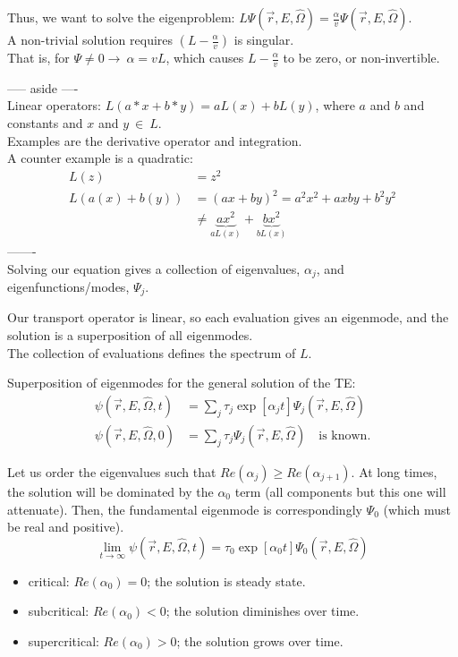 \documentclass[12pt]{article}
\newcommand{\rvec}{\ensuremath{\vec{r}}}
\newcommand{\vOmega}{\ensuremath{\hat{\Omega}}}
\begin{document}
Thus, we want to solve the eigenproblem: $L\Psi(\rvec, E, \vOmega) = \frac{\alpha}{v}\Psi(\rvec, E, \vOmega)$.\\
A non-trivial solution requires $(L - \frac{\alpha}{v})$ is singular. \\
That is, for $\Psi \neq 0 \rightarrow \: \alpha = v L$, which causes $L - \frac{\alpha}{v}$ to be zero, or non-invertible.


----- aside ----\\
Linear operators: $L(a*x + b*y) = aL(x) + bL(y)$, where $a$ and $b$ and constants and $x$ and $y \: \in \: L$.\\
Examples are the derivative operator and integration. \\
A counter example is a quadratic:
\begin{align*}
L(z) &= z^2 \\
L(a(x) + b(y)) &= (ax + by)^2 = a^2 x^2 + axby + b^2 y^2 \\
& \neq \underbrace{a x^2}_{aL(x)} + \underbrace{b x^2}_{bL(x)}
\end{align*}
-------\\
Solving our equation gives a collection of eigenvalues, $\alpha_j$, and eigenfunctions/modes, $\Psi_j$. 

Our transport operator is linear, so each evaluation gives an eigenmode, and the solution is a superposition of all eigenmodes. \\
The collection of evaluations defines the spectrum of $L$.

Superposition of eigenmodes for the general solution of the TE:
\begin{align*}
\psi(\rvec, E, \vOmega, t) &= \sum_{j} \tau_j \exp[\alpha_j t] \Psi_j(\rvec, E, \vOmega) \\
\psi(\rvec, E, \vOmega, 0) &= \sum_{j} \tau_j \Psi_j(\rvec, E, \vOmega) \quad \text{is known.}
\end{align*}

Let us order the eigenvalues such that $Re(\alpha_j) \geq Re(\alpha_{j+1})$. At long times, the solution will be dominated by the $\alpha_0$ term (all components but this one will attenuate). Then, the fundamental eigenmode is correspondingly $\Psi_0$ (which must be real and positive).
\[\lim_{t \to \infty} \psi(\rvec, E, \vOmega, t) = \tau_0 \exp[\alpha_0 t] \Psi_0(\rvec, E, \vOmega)\]
%
\begin{itemize}
\item critical: $Re(\alpha_0) = 0$; the solution is steady state. 
\item subcritical: $Re(\alpha_0) < 0$; the solution diminishes over time.
\item supercritical: $Re(\alpha_0) > 0$; the solution grows over time.
\end{itemize} 
%
\end{document}
